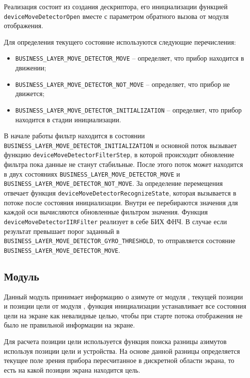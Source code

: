 Реализация состоит из создания дескриптора, его инициализации функцией \lstinline{deviceMoveDetectorOpen} вместе с параметром обратного вызова от модуля
отображения.

Для определения текущего состояние используются следующие перечисления:

\begin{itemize}
    \item \lstinline{BUSINESS_LAYER_MOVE_DETECTOR_MOVE} -- определяет, что прибор находится в движении;
    \item \lstinline{BUSINESS_LAYER_MOVE_DETECTOR_NOT_MOVE} -- определяет, что прибор не движется; 
    \item \lstinline{BUSINESS_LAYER_MOVE_DETECTOR_INITIALIZATION} -- определяет, что прибор находится в стадии инициализации.
\end{itemize}

В начале работы фильтр находится в состоянии \lstinline{BUSINESS_LAYER_MOVE_DETECTOR_INITIALIZATION} и основной поток вызывает функцию
\lstinline{deviceMoveDetectorFilterStep}, в которой происходит обновление фильтра пока данные не станут стабильные.
После этого поток может находится в двух состояниях \lstinline{BUSINESS_LAYER_MOVE_DETECTOR_MOVE} и \lstinline{BUSINESS_LAYER_MOVE_DETECTOR_NOT_MOVE}.
За определение перемещения отвечает функция \lstinline{deviceMoveDetectorRecognizeState}, которая вызывается в потоке после состояния инициализации.
Внутри ее перебираются значения для каждой оси вычисляются обновленные фильтром значения. Функция \lstinline{deviceMoveDetectorIIRFilter} реализует в себе
БИХ ФНЧ. В случае если результат превышает порог заданный в \lstinline{BUSINESS_LAYER_MOVE_DETECTOR_GYRO_THRESHOLD}, то отправляется состояние \lstinline{BUSINESS_LAYER_MOVE_DETECTOR_MOVE}.

\subsection{Модуль \moduleFindTarget}

Данный модуль принимает информацию о азимуте от модуля \moduleOrientationAzimuth, 
текущей позиции и позиции цели от модуля \moduleUart, функция инициализации устанавливает все состояния цели на экране как невалидные
целью, чтобы при старте потока отображения не было не правильной информации на экране. 

Для расчета позиции цели используется функция поиска разницы азимутов используя позиции цели и устройства. На основе данной разницы
определяется текущее поле зрения прибора пересчитанное в дискретной области экрана, то есть на какой позиции экрана находится цель.


